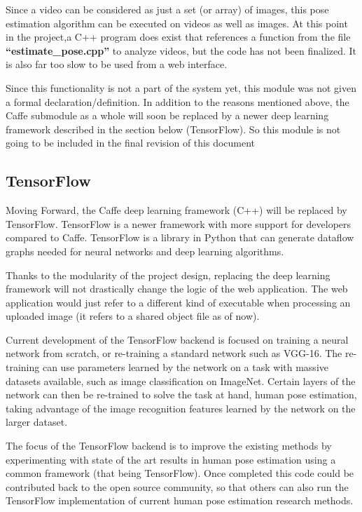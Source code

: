 \documentclass{scrreprt}
\begin{document}
Since a video can be considered as just a set (or array) of images, this pose
estimation algorithm can be executed on videos as well as images. At this point
in the project,a C++ program does exist that references a function from the
file \textbf{``estimate\_pose.cpp''} to analyze videos, but the code has not
been finalized. It is also far too slow to be used from a web interface.

Since this functionality is not a part of the system yet, this module was not
given a formal declaration/definition. In addition to the reasons mentioned
above, the Caffe submodule as a whole will soon be replaced by a newer deep
learning framework described in the section below (TensorFlow). So this module
is not going to be included in the final revision of this document

\subsection{TensorFlow}

Moving Forward, the Caffe deep learning framework (C++) will be replaced by
TensorFlow. TensorFlow is a newer framework with more support for developers
compared to Caffe. TensorFlow is a library in Python that can generate dataflow
graphs needed for neural networks and deep learning algorithms.

Thanks to the modularity of the project design, replacing the deep learning
framework will not drastically change the logic of the web application. The web
application would just refer to a different kind of executable when processing
an uploaded image (it refers to a shared object file as of now).

Current development of the TensorFlow backend is focused on training a neural
network from scratch, or re-training a standard network such as VGG-16. The
re-training can use parameters learned by the network on a task with massive
datasets available, such as image classification on ImageNet. Certain layers of
the network can then be re-trained to solve the task at hand, human pose
estimation, taking advantage of the image recognition features learned by the
network on the larger dataset.

The focus of the TensorFlow backend is to improve the existing methods by
experimenting with state of the art results in human pose estimation using a
common framework (that being TensorFlow). Once completed this code could be
contributed back to the open source community, so that others can also run the
TensorFlow implementation of current human pose estimation research methods.
\end{document}
